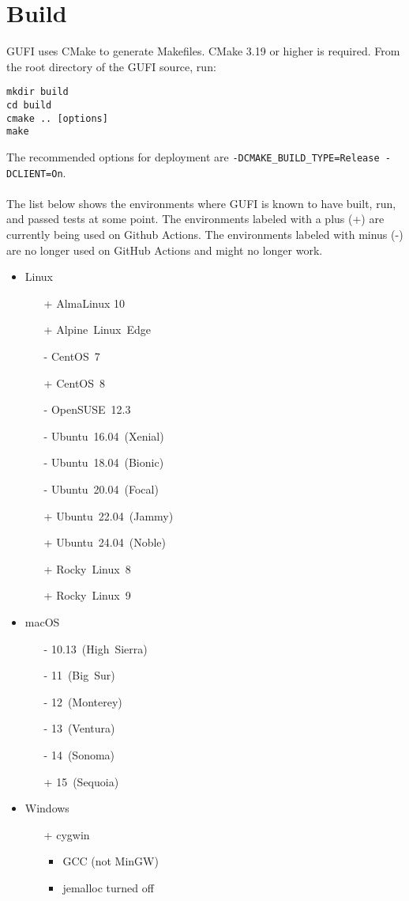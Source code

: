 \section{Build}

GUFI uses CMake to generate Makefiles. CMake 3.19 or higher is
required. From the root directory of the GUFI source, run:
\begin{verbatim}
mkdir build
cd build
cmake .. [options]
make
\end{verbatim}

The recommended options for deployment are
\texttt{-DCMAKE\_BUILD\_TYPE=Release -DCLIENT=On}.
\\\\
The list below shows the environments where GUFI is known to have
built, run, and passed tests at some point. The environments labeled
with a plus (+) are currently being used on Github Actions. The
environments labeled with minus (-) are no longer used on GitHub
Actions and might no longer work.
\begin{itemize}
\item Linux
  \begin{itemize}
  \item[+] AlmaLinux 10
  \item[+] Alpine~Linux~Edge
  \item[-] CentOS~7
  \item[+] CentOS~8
  \item[-] OpenSUSE~12.3
  \item[-] Ubuntu~16.04~(Xenial)
  \item[-] Ubuntu~18.04~(Bionic)
  \item[-] Ubuntu~20.04~(Focal)
  \item[+] Ubuntu~22.04~(Jammy)
  \item[+] Ubuntu~24.04~(Noble)
  \item[+] Rocky~Linux~8
  \item[+] Rocky~Linux~9
  \end{itemize}
\item macOS
  \begin{itemize}
  \item[-] 10.13~(High~Sierra)
  \item[-] 11~(Big~Sur)
  \item[-] 12~(Monterey)
  \item[-] 13~(Ventura)
  \item[-] 14~(Sonoma)
  \item[+] 15~(Sequoia)
  \end{itemize}
\item Windows
  \begin{itemize}
  \item[+] cygwin
    \begin{itemize}
    \item GCC (not MinGW)
    \item jemalloc turned off
    \end{itemize}
  \end{itemize}
\end{itemize}

